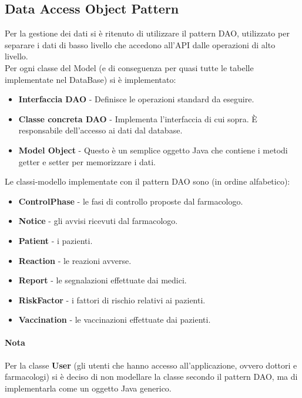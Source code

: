 \documentclass[11pt]{article}
\begin{document}
        \subsection{Data Access Object Pattern}
            Per la gestione dei dati si è ritenuto di utilizzare il pattern DAO, utilizzato per separare i dati di basso livello che accedono all'API dalle operazioni di alto livello.\\
            Per ogni classe del Model (e di conseguenza per quasi tutte le tabelle implementate nel DataBase) si è implementato:
                \begin{itemize}
                    \item \textbf{Interfaccia DAO} - Definisce le operazioni standard da eseguire.
                    \item \textbf{Classe concreta DAO} - Implementa l'interfaccia di cui sopra. È responsabile dell'accesso ai dati dal database.
                    \item \textbf{Model Object} - Questo è un semplice oggetto Java che contiene i metodi getter e setter per memorizzare i dati.
                \end{itemize}
            Le classi-modello implementate con il pattern DAO sono (in ordine alfabetico):
                \begin{itemize}
                    \item \textbf{ControlPhase} - le fasi di controllo proposte dal farmacologo.
                    \item \textbf{Notice} - gli avvisi ricevuti dal farmacologo.
                    \item \textbf{Patient} - i pazienti.
                    \item \textbf{Reaction} - le reazioni avverse.
                    \item \textbf{Report} - le segnalazioni effettuate dai medici.
                    \item \textbf{RiskFactor} - i fattori di rischio relativi ai pazienti.
                    \item \textbf{Vaccination} - le vaccinazioni effettuate dai pazienti.
                \end{itemize}

            \paragraph*{Nota}
            Per la classe \textbf{User} (gli utenti che hanno accesso all'applicazione, ovvero dottori e farmacologi) si è deciso di non modellare la classe secondo il pattern DAO, ma di implementarla come un oggetto Java generico.
\end{document}
